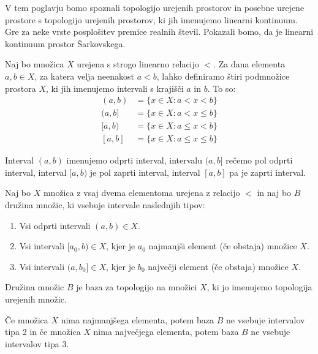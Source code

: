 \documentclass[../TG_magistrsko_delo_sections.tex]{subfiles}
\begin{document}
V tem poglavju bomo spoznali topologijo urejenih prostorov in posebne urejene prostore s topologijo urejenih prostorov, ki jih imenujemo linearni kontinuum. Gre za neke vrste posplošitev premice realnih števil. Pokazali bomo, da je linearni kontinuum prostor Šarkovskega.

Naj bo množica $X$ urejena s strogo linearno relacijo $<$. Za dana elementa $a, b \in X$, za katera velja neenakost $a<b$, lahko definiramo štiri podmnožice prostora $X$, ki jih imenujemo intervali s krajišči $a$ in $b$. To so:
\begin{equation*} %
\begin{split}
(a, b) &= \{x \in X: a< x <b\} \\ 
(a, b] &= \{x \in X: a< x \leq b\} \\ 
[a, b) &= \{x \in X: a \leq x< b\} \\ 
[a, b] &= \{x \in X: a \leq x \leq b\}
\end{split}
\end{equation*}

\begin{opomba}\label{op:intervali}
Interval $(a, b)$ imenujemo odprti interval, intervalu $(a, b]$ rečemo pol odprti interval, interval $[a, b)$ je pol zaprti interval, interval $[a, b]$ pa je zaprti interval.
\end{opomba}

\begin{definicija}
Naj bo $X$ množica z vsaj dvema elementoma urejena z relacijo $<$ in naj bo $B$ družina množic, ki vsebuje intervale naslednjih tipov:
\begin{enumerate}
\item Vsi odprti intervali $(a, b) \in X$.
\item Vsi intervali $[a_0, b) \in X$, kjer je $a_0$ najmanjši element (če obstaja) množice $X$.
\item Vsi intervali $(a, b_0] \in X$, kjer je $b_0$ največji element (če obstaja) množice $X$.
\end{enumerate}
Družina množic $B$ je baza za topologijo na množici $X$, ki jo imenujemo topologija urejenih množic.
\end{definicija}

\begin{opomba}\label{op:ekstremi}
Če množica $X$ nima najmanjšega elementa, potem baza $B$ ne vsebuje intervalov tipa 2 in če množica $X$ nima največjega elementa, potem baza $B$ ne vsebuje intervalov tipa 3.
\end{opomba}
\end{document}
